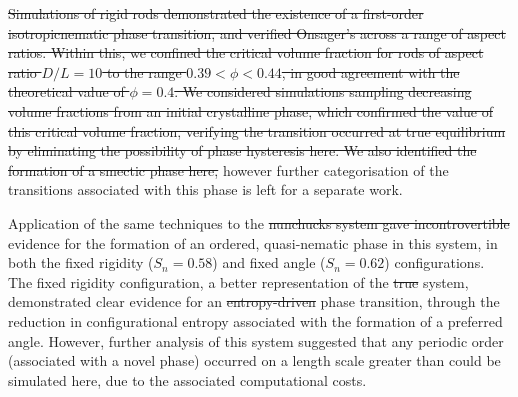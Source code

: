 \documentclass[11pt, a4paper]{article} %
\providecommand{\DIFadd}[1]{{\protect\color{blue}\uwave{#1}}} %
\providecommand{\DIFdel}[1]{{\protect\color{red}\sout{#1}}}                      %
\providecommand{\DIFaddbegin}{} %
\providecommand{\DIFaddend}{} %
\providecommand{\DIFdelbegin}{} %
\providecommand{\DIFdelend}{} %
\begin{document}
\DIFdelbegin \DIFdel{Simulations of rigid rods demonstrated the existence of a first-order isotropic\textendash nematic phase transition, and verified Onsager's across a range of aspect ratios. Within this, we confined the critical volume fraction for rods of aspect ratio $D/L = 10$ to the range $0.39<\phi<0.44$, in good agreement with the theoretical value of $\phi = 0.4$. We considered simulations sampling decreasing volume fractions from an initial crystalline phase, which confirmed the value of this critical volume fraction, verifying the transition occurred at true equilibrium by eliminating the possibility of phase hysteresis here. We also identified the formation of a smectic phase here, }\DIFdelend \DIFaddbegin \DIFadd{\textcolor{forestgreen}{My simulations of rigid rods were consistent with Onsager's prediction of the existence of a first-order ``entropic'' phase transition between the isotropic and nematic phases of slender hard rods, for a wide range of aspect ratios.
On the basis of the Onsager predictions for the transition volume fraction $\phi = 0.4$ for rods with aspect ratio $L/D = 10$, 
we focused our simulations on a range of volume fractions $0.39<\phi<0.44$.
Further, to monitor the nematic-to-smectic phase transition I started by preparing an  initial crystalline phase, followed by a stepwise expansion of the simulation box combined with equilibration runs. These simulations confirmed the value of this critical volume fraction, thus confirming that my simulation lead to true equilibrium and the elimination of possible phase hysteresis. We identified the existence of a smectic phase,} }\DIFaddend however further categorisation of the transitions associated with this phase is left for a separate work.

Application of the same techniques to the \DIFdelbegin \DIFdel{nunchucks system gave incontrovertible }\DIFdelend \DIFaddbegin \DIFadd{nunchuck system gave }\DIFaddend evidence for the formation of an ordered, quasi-nematic phase in this system, in both the fixed rigidity ($S_{n} = 0.58$) and fixed angle ($S_{n} = 0.62$) configurations. The fixed rigidity configuration, a better representation of the \DIFdelbegin \DIFdel{true }\DIFdelend \DIFaddbegin \DIFadd{\textcolor{forestgreen}{more realistic DNA} }\DIFaddend system, demonstrated clear evidence for an \DIFdelbegin \DIFdel{entropy-driven }\DIFdelend \DIFaddbegin \DIFadd{entropy\textendash driven }\DIFaddend phase transition, through the reduction in configurational entropy associated with the formation of a preferred angle. However, further analysis of this system suggested that any periodic order (associated with a novel phase) occurred on a length scale greater than could be simulated here, due to the associated computational costs.
\end{document}
